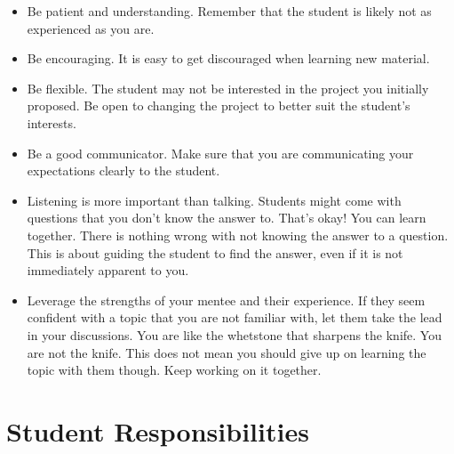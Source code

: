 \documentclass{article}
\begin{document}
\begin{itemize}


\item Be patient and understanding. Remember that the student is likely not as experienced as
you are.

\item Be encouraging. It is easy to get discouraged when learning new material. 

\item Be flexible. The student may not be interested in the project you initially
proposed. Be open to changing the project to better suit the student's
interests.

\item Be a good communicator. Make sure that you are communicating
your expectations clearly to the student.

\item Listening is more important than talking. Students might come with questions that you don't 
know the answer to. That's okay! You can learn together. There is nothing wrong with not
knowing the answer to a question. This is about guiding the student to find the answer, even
if it is not immediately apparent to you. 

\item Leverage the strengths of your mentee and their experience. If they seem confident with a
  topic that you are not familiar with, let them take the lead in your discussions. You are like the
  whetstone that sharpens the knife. You are not the knife. This does not mean you should give up on
  learning the topic with them though. Keep working on it together.

\end{itemize}

\section{Student Responsibilities}
\end{document}
